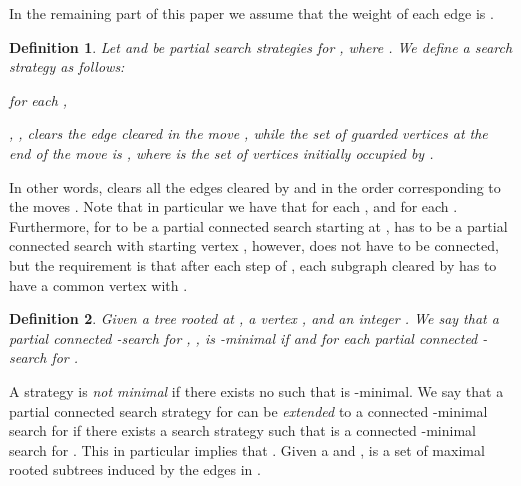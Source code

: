 \documentclass[10pt]{article}
\newtheorem{definition}{Definition}
\begin{document}
In the remaining part of this paper we assume that the weight of each edge  is .

\begin{definition}
Let  and  be partial search strategies for , where . We define a search strategy  as follows:
\begin{list}{}{}
\item[1.]  for each ,
\item[2.] , , clears the edge cleared in the move , while the set of guarded vertices at the end of the move  is , where  is the set of vertices initially occupied by .
\end{list}
\end{definition}
In other words,  clears all the edges cleared by  and  in the order corresponding to the moves .
Note that in particular we have that  for each , and  for each .
Furthermore, for  to be a partial connected search starting at ,  has to be a partial connected search with starting vertex , however,  does not have to be connected, but the requirement is that after each step of , each subgraph cleared by  has to have a common vertex with .

\begin{definition}
Given a tree  rooted at , a vertex , and an integer . We say that a partial connected -search  for , , is -\emph{minimal} if  and  for each partial connected -search  for .
\end{definition}
A strategy  is \emph{not minimal} if there exists no  such that  is -minimal.
We say that a partial connected search strategy  for  can be \emph{extended} to a connected -minimal search for  if there exists a search strategy  such that  is a connected -minimal search for . This in particular implies that . Given a  and ,  is a set of maximal rooted subtrees induced by the edges in .
\end{document}
